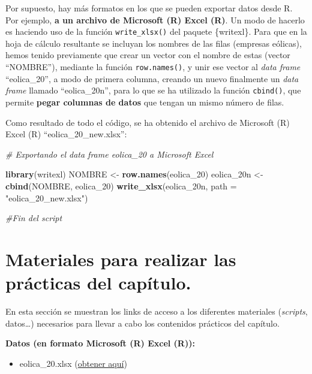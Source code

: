 \documentclass[
]{book}
\newenvironment{Shaded}{\begin{snugshade}}{\end{snugshade}}
\newcommand{\AttributeTok}[1]{\textcolor[rgb]{0.13,0.29,0.53}{#1}}
\newcommand{\CommentTok}[1]{\textcolor[rgb]{0.56,0.35,0.01}{\textit{#1}}}
\newcommand{\FunctionTok}[1]{\textcolor[rgb]{0.13,0.29,0.53}{\textbf{#1}}}
\newcommand{\NormalTok}[1]{#1}
\newcommand{\OtherTok}[1]{\textcolor[rgb]{0.56,0.35,0.01}{#1}}
\newcommand{\StringTok}[1]{\textcolor[rgb]{0.31,0.60,0.02}{#1}}
\providecommand{\tightlist}{%
  \setlength{\itemsep}{0pt}\setlength{\parskip}{0pt}}
\begin{document}
Por supuesto, hay más formatos en los que se pueden exportar datos desde R. Por ejemplo, \textbf{a un archivo de Microsoft (R) Excel (R)}. Un modo de hacerlo es haciendo uso de la función \texttt{write\_xlsx()} del paquete \{writexl\}. Para que en la hoja de cálculo resultante se incluyan los nombres de las filas (empresas eólicas), hemos tenido previamente que crear un vector con el nombre de estas (vector ``NOMBRE''), mediante la función \texttt{row.names()}, y unir ese vector al \emph{data frame} ``eolica\_20'', a modo de primera columna, creando un nuevo finalmente un \emph{data frame} llamado ``eolica\_20n'', para lo que se ha utilizado la función \texttt{cbind()}, que permite \textbf{pegar columnas de datos} que tengan un mismo número de filas.

Como resultado de todo el código, se ha obtenido el archivo de Microsoft (R) Excel (R) ``eolica\_20\_new.xlsx'':

\begin{Shaded}
\begin{Highlighting}[]
\CommentTok{\# Exportando el data frame eolica\_20 a Microsoft Excel}

\FunctionTok{library}\NormalTok{(writexl)}
\NormalTok{NOMBRE }\OtherTok{\textless{}{-}} \FunctionTok{row.names}\NormalTok{(eolica\_20)}
\NormalTok{eolica\_20n }\OtherTok{\textless{}{-}} \FunctionTok{cbind}\NormalTok{(NOMBRE, eolica\_20)}
\FunctionTok{write\_xlsx}\NormalTok{(eolica\_20n, }\AttributeTok{path =} \StringTok{"eolica\_20\_new.xlsx"}\NormalTok{)}

\CommentTok{\#Fin del script}
\end{Highlighting}
\end{Shaded}

\section{Materiales para realizar las prácticas del capítulo.}\label{materiales-para-realizar-las-pruxe1cticas-del-capuxedtulo.}

En esta sección se muestran los links de acceso a los diferentes materiales (\emph{scripts}, datos\ldots) necesarios para llevar a cabo los contenidos prácticos del capítulo.

\textbf{Datos (en formato Microsoft (R) Excel (R)):}

\begin{itemize}
\tightlist
\item
  eolica\_20.xlsx (\href{https://docs.google.com/spreadsheets/d/1YDFCd0Z7udeIi6WdNYwthYHGmJSrEfG1/edit?usp=drive_link&ouid=115375878280465826079&rtpof=true&sd=true}{obtener aquí})
\end{itemize}
\end{document}
